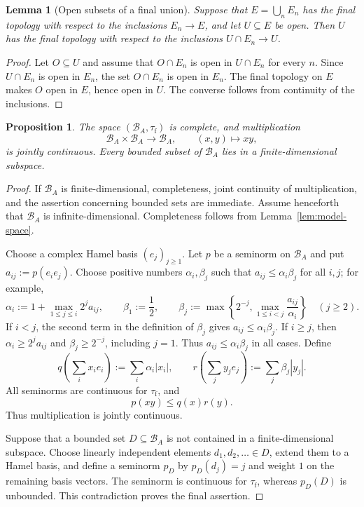 \documentclass[11pt]{article}
\newtheorem{proposition}[theorem]{Proposition}
\newtheorem{lemma}[theorem]{Lemma}
\theoremstyle{remark}
\begin{document}
\begin{lemma}[Open subsets of a final union]
\label{lem:open-final}
Suppose that $E=\bigcup_nE_n$ has the final topology with respect to the
inclusions $E_n\to E$, and let $U\subseteq E$ be open.  Then $U$ has the final
topology with respect to the inclusions $U\cap E_n\to U$.
\end{lemma}

\begin{proof}
Let $O\subseteq U$ and assume that $O\cap E_n$ is open in $U\cap E_n$ for
every $n$.  Since $U\cap E_n$ is open in $E_n$, the set $O\cap E_n$ is open
in $E_n$.  The final topology on $E$ makes $O$ open in $E$, hence open in
$U$.  The converse follows from continuity of the inclusions.
\end{proof}

\begin{proposition}
\label{prop:topological-algebra}
The space $(\mathcal B_A,\tau_{\mathrm f})$ is complete, and multiplication
\[
  \mathcal B_A\times\mathcal B_A\to\mathcal B_A,
  \qquad (x,y)\mapsto xy,
\]
is jointly continuous.  Every bounded subset of $\mathcal B_A$ lies in a
finite-dimensional subspace.
\end{proposition}

\begin{proof}
If $\mathcal B_A$ is finite-dimensional, completeness, joint continuity of
multiplication, and the assertion concerning bounded sets are immediate.
Assume henceforth that $\mathcal B_A$ is infinite-dimensional.  Completeness
follows from Lemma~\ref{lem:model-space}.

Choose a complex Hamel basis $(e_j)_{j\geq1}$.  Let $p$ be a seminorm on
$\mathcal B_A$ and put $a_{ij}:=p(e_ie_j)$.  Choose positive numbers
$\alpha_i,\beta_j$ such that $a_{ij}\leq\alpha_i\beta_j$ for all $i,j$; for
example,
\[
  \alpha_i:=1+\max_{1\leq j\leq i}2^j a_{ij},
  \qquad
  \beta_1:=\frac12,
  \qquad
  \beta_j:=\max\left\{2^{-j},
  \max_{1\leq i<j}\frac{a_{ij}}{\alpha_i}\right\}
  \quad(j\geq2).
\]
If $i<j$, the second term in the definition of $\beta_j$ gives
$a_{ij}\leq\alpha_i\beta_j$.  If $i\geq j$, then
$\alpha_i\geq2^ja_{ij}$ and $\beta_j\geq2^{-j}$, including $j=1$.
Thus $a_{ij}\leq\alpha_i\beta_j$ in all cases.  Define
\[
  q\left(\sum_i x_ie_i\right):=\sum_i\alpha_i|x_i|,
  \qquad
  r\left(\sum_j y_je_j\right):=\sum_j\beta_j|y_j|.
\]
All seminorms are continuous for $\tau_{\mathrm f}$, and
\[
  p(xy)\leq q(x)r(y).
\]
Thus multiplication is jointly continuous.

Suppose that a bounded set $D\subseteq\mathcal B_A$ is not contained in a
finite-dimensional subspace.  Choose linearly independent elements
$d_1,d_2,\ldots\in D$, extend them to a Hamel basis, and define a seminorm
$p_D$ by $p_D(d_j)=j$ and weight $1$ on the remaining basis vectors.  The
seminorm is continuous for $\tau_{\mathrm f}$, whereas $p_D(D)$ is
unbounded.  This contradiction proves the final assertion.
\end{proof}
\end{document}
